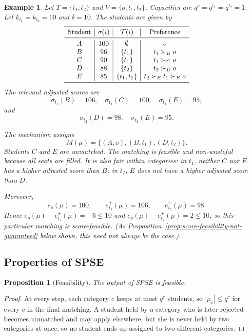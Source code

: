 \documentclass[10pt]{article}
\newtheorem{proposition}{Proposition}
\newtheorem{example}{Example}
\newcommand{\T}{\mathcal{T}}
\newcommand{\1}{\mathbf{1}}
\begin{document}
\begin{example}
Let $T=\{t_1,t_2\}$ and $V=\{o,t_1,t_2\}$. Capacities are $q^o=q^{t_1}=q^{t_2}=1$. Let $k_{t_1}=k_{t_2}=10$ and $\delta=10$. The students are given by
\[
\begin{array}{c|c|c|c}
\toprule
\text{Student} & \sigma(i) & \T(i) & \text{Preference} \\
\midrule
A & 100 & \emptyset & o \\
B & 96 & \{t_1\} & t_1\succ_B o \\
C & 90 & \{t_1\} & t_1\succ_C o \\
D & 88 & \{t_2\} & t_2\succ_D o \\
E & 85 & \{t_1,t_2\} & t_2\succ_E t_1\succ_E o \\
\bottomrule
\end{array}
\]
The relevant adjusted scores are
\[
\sigma_{t_1}(B)=106,\quad
\sigma_{t_1}(C)=100,\quad
\sigma_{t_1}(E)=95,
\]
and
\[
\sigma_{t_2}(D)=98,\quad
\sigma_{t_2}(E)=95.
\]

The mechanism assigns
\[
M(\mu)=\{(A,o),(B,t_1),(D,t_2)\}.
\]
Students $C$ and $E$ are unmatched. The matching is feasible and non-wasteful because all seats are filled. It is also fair within categories: in $t_1$, neither $C$ nor $E$ has a higher adjusted score than $B$; in $t_2$, $E$ does not have a higher adjusted score than $D$.

Moreover,
\[
e_o(\mu)=100,
\qquad
e_{t_1}^+(\mu)=106,
\qquad
e_{t_2}^+(\mu)=98.
\]
Hence $e_o(\mu)-e_{t_1}^+(\mu)=-6\le 10$ and $e_o(\mu)-e_{t_2}^+(\mu)=2\le 10$, so this particular matching is score-feasible. (As Proposition~\ref{prop:score-feasibility-not-guaranteed} below shows, this need not always be the case.)
\end{example}

\subsection{Properties of SPSE}

\begin{proposition}[Feasibility]\label{prop:feasibility}
The output of SPSE is feasible.
\end{proposition}
\begin{proof}
At every step, each category $c$ keeps at most $q^c$ students, so $|\mu_c|\le q^c$ for every $c$ in the final matching. A student held by a category who is later rejected becomes unmatched and may apply elsewhere, but she is never held by two categories at once, so no student ends up assigned to two different categories.
\end{proof}
\end{document}
